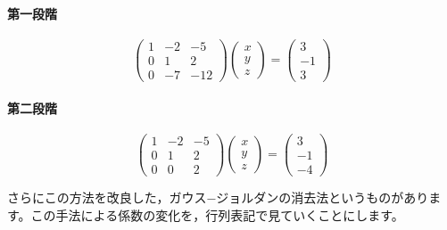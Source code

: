 \documentclass{ltjsbook}
\begin{document}
\paragraph{第一段階}
\[
	\begin{pmatrix} 1 & -2 & -5  \\
                0 & 1  & 2   \\
                0 & -7 & -12\end{pmatrix}
	\begin{pmatrix} x \\ y \\ z \end{pmatrix}
	=
	\begin{pmatrix} 3 \\ -1 \\ 3 \end{pmatrix}
\]

\paragraph{第二段階}

\[
	\begin{pmatrix} 1 & -2 & -5 \\
                0 & 1  & 2  \\
                0 & 0  & 2\end{pmatrix}
	\begin{pmatrix} x \\ y \\ z \end{pmatrix}
	=
	\begin{pmatrix} 3 \\ -1 \\ -4 \end{pmatrix}
\]

さらにこの方法を改良した，ガウス−ジョルダンの消去法というものがあります。この手法による係数の変化を，行列表記で見ていくことにします。
\end{document}
